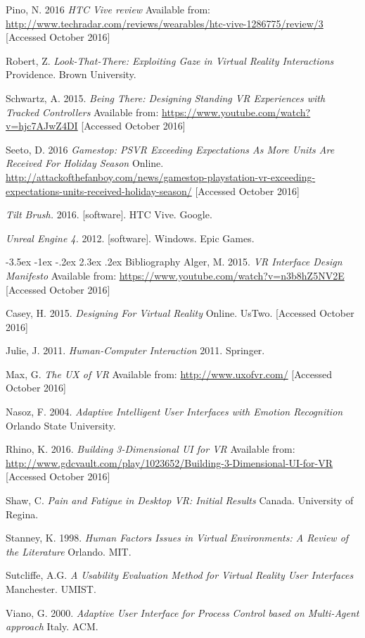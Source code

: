 \documentclass[11pt]{article}
\makeatletter
\renewcommand{\section}{\@startsection {section}{1}{\z@}%
             {-3.5ex \@plus -1ex \@minus -.2ex}%
             {2.3ex \@plus .2ex}%
             {\normalfont\Large\scshape\bfseries}}
\makeatother
\begin{document}
Pino, N. 2016 \emph{HTC Vive review} Available from: \url{http://www.techradar.com/reviews/wearables/htc-vive-1286775/review/3} [Accessed October 2016]

Robert, Z. \emph{Look-That-There: Exploiting Gaze in Virtual Reality Interactions} Providence. Brown University. 

Schwartz, A. 2015. \emph{Being There: Designing Standing VR Experiences with Tracked Controllers} Available from: \url{https://www.youtube.com/watch?v=hjc7AJwZ4DI} [Accessed October 2016]
	
Seeto, D. 2016 \emph{Gamestop: PSVR Exceeding Expectations As More Units Are Received For Holiday Season} Online. \url{http://attackofthefanboy.com/news/gamestop-playstation-vr-exceeding-expectations-units-received-holiday-season/} [Accessed October 2016]

\emph{Tilt Brush.} 2016. [software]. HTC Vive. Google. 

\emph{Unreal Engine 4.} 2012. [software]. Windows. Epic Games. 


\section{Bibliography}
Alger, M. 2015. \emph{VR Interface Design Manifesto} Available from: \url{https://www.youtube.com/watch?v=n3b8hZ5NV2E} [Accessed October 2016]

Casey, H. 2015. \emph{Designing For Virtual Reality} Online. UsTwo. [Accessed October 2016]

Julie, J. 2011. \emph{Human-Computer Interaction} 2011. Springer. 

Max, G. \emph{The UX of VR} Available from: \url{http://www.uxofvr.com/} [Accessed October 2016]

Nasoz, F. 2004. \emph{Adaptive Intelligent User Interfaces with Emotion Recognition} Orlando State University. 

Rhino, K. 2016. \emph{Building 3-Dimensional UI for VR} Available from: \url{http://www.gdcvault.com/play/1023652/Building-3-Dimensional-UI-for-VR} [Accessed October 2016]

Shaw, C. \emph{Pain and Fatigue in Desktop VR: Initial Results} Canada. University of Regina. 

Stanney, K. 1998. \emph{Human Factors Issues in Virtual Environments: A Review of the Literature} Orlando. MIT. 

Sutcliffe, A.G. \emph{A Usability Evaluation Method for Virtual Reality User Interfaces} Manchester. UMIST. 

Viano, G. 2000. \emph{Adaptive User Interface for Process Control based on Multi-Agent approach} Italy. ACM. 
\end{document}
